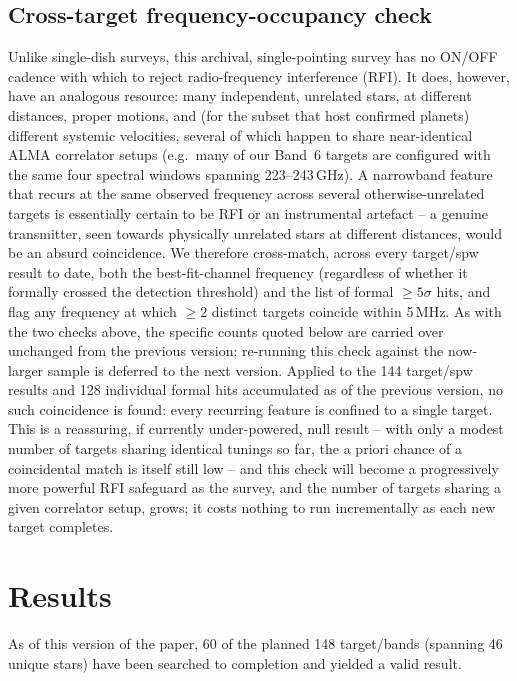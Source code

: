 \documentclass{openjournal}
\begin{document}
\subsection{Cross-target frequency-occupancy check}
\label{sec:freqoccupancy}

Unlike single-dish surveys, this archival, single-pointing survey has no
ON/OFF cadence with which to reject radio-frequency interference (RFI).
It does, however, have an analogous resource: many independent,
unrelated stars, at different distances, proper motions, and (for the
subset that host confirmed planets) different systemic velocities,
several of which happen to share near-identical ALMA correlator setups
(e.g.\ many of our Band~6 targets are configured with the same four
spectral windows spanning 223--243\,GHz). A narrowband feature that
recurs at the same observed frequency across several otherwise-unrelated
targets is essentially certain to be RFI or an instrumental artefact --
a genuine transmitter, seen towards physically unrelated stars at
different distances, would be an absurd coincidence. We therefore
cross-match, across every target/spw result to date, both the
best-fit-channel frequency (regardless of whether it formally crossed
the detection threshold) and the list of formal $\geq5\sigma$ hits, and
flag any frequency at which $\geq2$ distinct targets coincide within
5\,MHz. As with the two checks above, the specific counts quoted below
are carried over unchanged from the previous version; re-running this
check against the now-larger sample is deferred to the next version.
Applied to the 144 target/spw results and 128 individual formal
hits accumulated as of the previous version, no such coincidence is found: every recurring
feature is confined to a single target. This is a reassuring, if
currently under-powered, null result -- with only a modest number of
targets sharing identical tunings so far, the a priori chance of a
coincidental match is itself still low -- and this check will become a
progressively more powerful RFI safeguard as the survey, and the number
of targets sharing a given correlator setup, grows; it costs nothing to
run incrementally as each new target completes.

\section{Results}
\label{sec:results}

As of this version of the paper, 60 of the planned 148 target/bands
(spanning 46 unique stars) have been searched to completion and yielded
a valid result.
\end{document}
